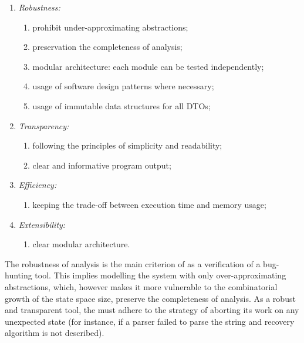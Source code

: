 \vspace{0.5em}
\begin{enumerate}[nolistsep]
  \item \textit{Robustness:}
    \begin{enumerate}[label*=\arabic*.]
      \item prohibit under-approximating abstractions;
      \item preservation the completeness of analysis;
      \item modular architecture: each module can be tested independently;
      \item usage of software design patterns where necessary;
      \item usage of immutable data structures for all DTOs;
    \end{enumerate}
  \item \textit{Transparency:}
    \begin{enumerate}[label*=\arabic*.]
      \item following the principles of simplicity and readability;
      \item clear and informative program output;
    \end{enumerate}
  \item \textit{Efficiency:}
    \begin{enumerate}[label*=\arabic*.]%
      \item keeping the trade-off between execution time and memory usage;
    \end{enumerate}
  \item \textit{Extensibility:}
    \begin{enumerate}[label*=\arabic*.]%
      \item clear modular architecture.
    \end{enumerate}
\end{enumerate}

The robustness of analysis is the main criterion of \porthos[2] as a verification of a bug-hunting tool.
This implies modelling the system with only over-approximating abstractions, which, however makes it more vulnerable to the combinatorial growth of the state space size, preserve the completeness of analysis.
As a robust and transparent tool, the \porthos[2] must adhere to the strategy of aborting its work on any unexpected state (for instance, if a parser failed to parse the string and recovery algorithm is not described).

